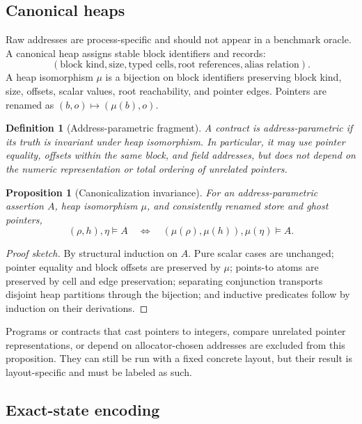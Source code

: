 \documentclass[10pt]{article}
\newtheorem{definition}{Definition}
\newtheorem{proposition}{Proposition}
\newcommand{\sat}{\models}
\newcommand{\ghost}{\eta}
\begin{document}
\subsection{Canonical heaps}
\label{sec:canonical}

Raw addresses are process-specific and should not appear in a benchmark
oracle.  A canonical heap assigns stable block identifiers and records:
\[
  (\text{block kind},\text{size},\text{typed cells},\text{root references},
   \text{alias relation}).
\]
A heap isomorphism $\mu$ is a bijection on block identifiers preserving block
kind, size, offsets, scalar values, root reachability, and pointer edges.
Pointers are renamed as $(b,o)\mapsto(\mu(b),o)$.

\begin{definition}[Address-parametric fragment]
A contract is address-parametric if its truth is invariant under heap
isomorphism.  In particular, it may use pointer equality, offsets within the
same block, and field addresses, but does not depend on the numeric
representation or total ordering of unrelated pointers.
\end{definition}

\begin{proposition}[Canonicalization invariance]
For an address-parametric assertion $A$, heap isomorphism $\mu$, and
consistently renamed store and ghost pointers,
\[
  (\rho,h),\ghost\sat A
  \quad\Longleftrightarrow\quad
  (\mu(\rho),\mu(h)),\mu(\ghost)\sat A.
\]
\end{proposition}
\begin{proof}[Proof sketch]
By structural induction on $A$.  Pure scalar cases are unchanged; pointer
equality and block offsets are preserved by $\mu$; points-to atoms are
preserved by cell and edge preservation; separating conjunction transports
disjoint heap partitions through the bijection; and inductive predicates
follow by induction on their derivations.
\end{proof}

Programs or contracts that cast pointers to integers, compare unrelated pointer
representations, or depend on allocator-chosen addresses are excluded from this
proposition.  They can still be run with a fixed concrete layout, but their
result is layout-specific and must be labeled as such.

\subsection{Exact-state encoding}
\label{sec:exact}
\end{document}
